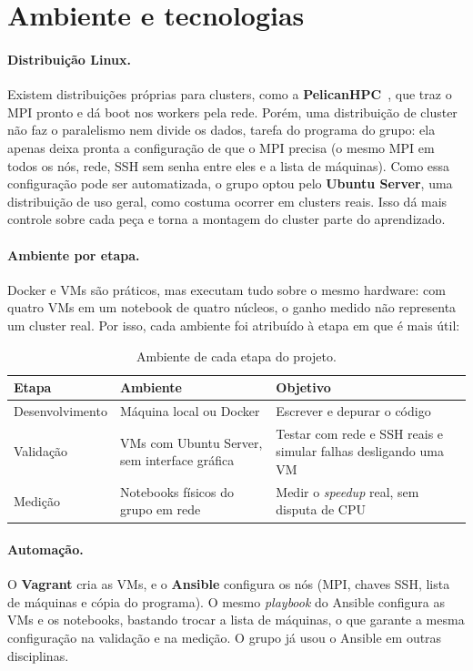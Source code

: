 \section{Ambiente e tecnologias}
\label{sec:ambiente}

\paragraph{Distribuição Linux.} Existem distribuições próprias para
clusters, como a \textbf{\mbox{PelicanHPC}}~\cite{pelicanhpc}, que traz o MPI
pronto e dá boot nos workers pela rede. Porém, uma distribuição de cluster
não faz o paralelismo nem divide os dados, tarefa do programa do grupo: ela
apenas deixa pronta a configuração de que o MPI precisa (o mesmo MPI em
todos os nós, rede, SSH sem senha entre eles e a lista de máquinas). Como
essa configuração pode ser automatizada, o grupo optou pelo
\textbf{Ubuntu Server}, uma distribuição de uso geral, como costuma
ocorrer em clusters reais. Isso dá mais controle sobre cada peça e torna a
montagem do cluster parte do aprendizado.

\paragraph{Ambiente por etapa.} Docker e VMs são práticos, mas executam
tudo sobre o mesmo hardware: com quatro VMs em um notebook de quatro
núcleos, o ganho medido não representa um cluster real. Por isso, cada
ambiente foi atribuído à etapa em que é mais útil:

\begin{table}[H]
  \centering
  \small
  \begin{tabularx}{\textwidth}{>{\raggedright}p{2.9cm}>{\raggedright}p{4.0cm}X}
    \toprule
    \textbf{Etapa} & \textbf{Ambiente} & \textbf{Objetivo} \\
    \midrule
    Desenvolvimento & Máquina local ou Docker &
      Escrever e depurar o código \\
    Validação & VMs com Ubuntu Server, sem interface gráfica &
      Testar com rede e SSH reais e simular falhas desligando uma VM \\
    Medição & Notebooks físicos do grupo em rede &
      Medir o \emph{speedup} real, sem disputa de CPU \\
    \bottomrule
  \end{tabularx}
  \caption{Ambiente de cada etapa do projeto.}
\end{table}

\paragraph{Automação.} O \textbf{Vagrant} cria as VMs, e o
\textbf{Ansible} configura os nós (MPI, chaves SSH, lista de máquinas e
cópia do programa). O mesmo \emph{playbook} do Ansible configura as VMs e
os notebooks, bastando trocar a lista de máquinas, o que garante a mesma
configuração na validação e na medição. O grupo já usou o Ansible em
outras disciplinas.

